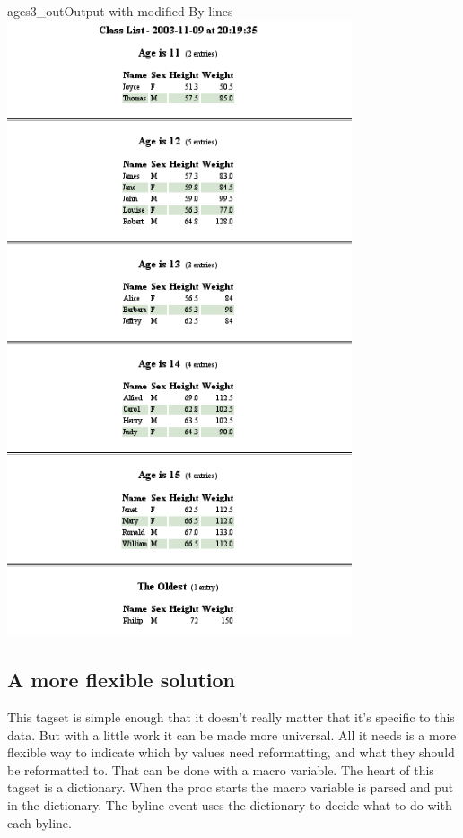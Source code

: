 \begin{goutput}{ages3_out}{Output with modified By lines}
\includegraphics[width=4in]{ages3.png}
\end{goutput}

\subsection{A more flexible solution}
This tagset is simple enough that it doesn't really matter that it's specific to this
data.  But with a little work it can be made more universal.  All it needs is a more
flexible way to indicate which by values need reformatting, and what they should be 
reformatted to.  That can be done with a macro variable. The heart of this tagset
is a dictionary.  When the proc starts the macro variable is parsed and put in 
the dictionary.  The byline event uses the dictionary to decide what to do with
each byline.  

